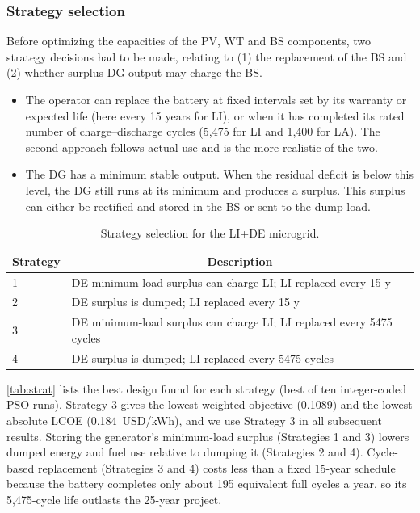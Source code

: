 \documentclass[final,3p,times]{elsarticle}
\begin{document}
\subsubsection{\label{sec:strat} Strategy selection}

Before optimizing the capacities of the PV, WT and BS components, two strategy decisions had to be made, relating to (1) the replacement of the BS and (2) whether surplus DG output may charge the BS.
\begin{itemize}
    \item The operator can replace the battery at fixed intervals set by its warranty or expected life (here every 15 years for LI), or when it has completed its rated number of charge--discharge cycles (5,475 for LI and 1,400 for LA). The second approach follows actual use and is the more realistic of the two.
    \item The DG has a minimum stable output. When the residual deficit is below this level, the DG still runs at its minimum and produces a surplus. This surplus can either be rectified and stored in the BS or sent to the dump load.
\end{itemize}

\begin{table}[htbp] 
\centering
\begin{tabular}{p{0.75cm} p{10cm}}
\toprule
\multicolumn{1}{c}{\textbf{Strategy}} & \multicolumn{1}{c}{\textbf{Description}}    \\
\midrule
1 & DE minimum-load surplus can charge LI; LI replaced every 15 y \\[1ex]
2 & DE surplus is dumped; LI replaced every 15 y \\[1ex]
3 & DE minimum-load surplus can charge LI; LI replaced every 5475 cycles \\[1ex]
4 & DE surplus is dumped; LI replaced every 5475 cycles \\
\bottomrule
\end{tabular}
\caption{Strategy selection for the LI+DE microgrid.}
\label{tab:strat_select} 
\end{table}

\cref{tab:strat} lists the best design found for each strategy (best of ten integer-coded PSO runs). Strategy 3 gives the lowest weighted objective (0.1089) and the lowest absolute LCOE (0.184~USD/kWh), and we use Strategy 3 in all subsequent results. Storing the generator's minimum-load surplus (Strategies 1 and 3) lowers dumped energy and fuel use relative to dumping it (Strategies 2 and 4). Cycle-based replacement (Strategies 3 and 4) costs less than a fixed 15-year schedule because the battery completes only about 195 equivalent full cycles a year, so its 5,475-cycle life outlasts the 25-year project.
\end{document}
